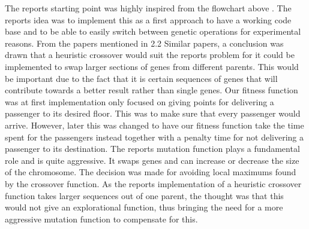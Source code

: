 
The reports starting point was highly inspired from the flowchart above \cite{tartan2016genetic} . The reports idea was to implement this as a first approach to have a working code base and to be able to easily switch between genetic operations for experimental reasons. From the papers mentioned in 2.2 Similar papers, a conclusion was drawn that a heuristic crossover would suit the reports problem for it could be implemented to swap larger sections of genes from different parents. This would be important due to the fact that it is certain sequences of genes that will contribute towards a better result rather than single genes. Our fitness function was at first implementation only focused on giving points for delivering a passenger to its desired floor. This was to make sure that every passenger would arrive. However, later this was changed to have our fitness function take the time spent for the passengers instead together with a penalty time for not delivering a passenger to its destination. The reports mutation function plays a fundamental role and is quite aggressive. It swaps genes and can increase or decrease the size of the chromosome. The decision was made for avoiding local maximums found by the crossover function. As the reports implementation of a heuristic crossover function takes larger sequences out of one parent, the thought was that this would not give an explorational function, thus bringing the need for a more aggressive mutation function to compensate for this.
